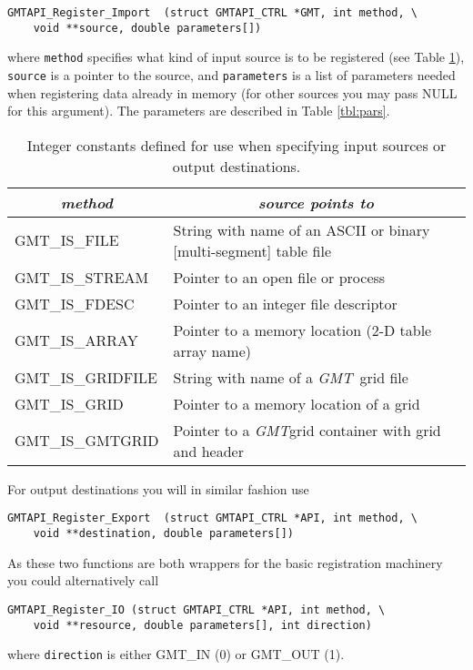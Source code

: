 \documentclass{report}
\newcommand{\GMT}{\textit{GMT}}%
\newcommand{\GMT}{\htmladdnormallink{\texttt{[image: eps/GMT\_glyph10.eps]}}{http://gmt.soest.hawaii.edu}}%
\newcommand{\GMT}{\htmladdnormallink{\textbf{GMT}}{http://gmt.soest.hawaii.edu}}%
\begin{document}
\begin{verbatim}
GMTAPI_Register_Import  (struct GMTAPI_CTRL *GMT, int method, \
    void **source, double parameters[])
\end{verbatim}
where \texttt{method} specifies what kind of input source is to be registered (see Table \ref{tbl:methods}),
\texttt{source} is a pointer to the source, and \texttt{parameters} is a list of parameters needed
when registering data already in memory (for other sources you may pass NULL for this argument).  The
parameters are described in Table \ref{tbl:pars}.
\begin{table}[h]
\small
\centering
\begin{tabular}{|l|l|} \hline
\multicolumn{1}{|c|}{\emph{method}} & \multicolumn{1}{c|}{\emph{source points to}} \\ \hline
GMT\_IS\_FILE		&       String with name of an ASCII or binary [multi-segment] table file \\ \hline
GMT\_IS\_STREAM		&       Pointer to an open file or process \\ \hline
GMT\_IS\_FDESC		&       Pointer to an integer file descriptor \\ \hline
GMT\_IS\_ARRAY		&       Pointer to a memory location (2-D table array name) \\ \hline
GMT\_IS\_GRIDFILE	&       String with name of a \GMT\ grid file \\ \hline
GMT\_IS\_GRID		&       Pointer to a memory location of a grid  \\ \hline
GMT\_IS\_GMTGRID	&       Pointer to a \GMT grid container with grid and header  \\ \hline
\end{tabular}
\caption{Integer constants defined for use when specifying input sources or output destinations.}
\label{tbl:methods}
\end{table}

For output destinations you will in similar fashion use

\begin{verbatim}
GMTAPI_Register_Export  (struct GMTAPI_CTRL *API, int method, \
    void **destination, double parameters[])
\end{verbatim}
As these two functions are both wrappers for the basic
registration machinery you could alternatively call
\begin{verbatim}
GMTAPI_Register_IO (struct GMTAPI_CTRL *API, int method, \
    void **resource, double parameters[], int direction)
\end{verbatim}
where \texttt{direction} is either GMT\_IN (0) or GMT\_OUT (1).
\end{document}
